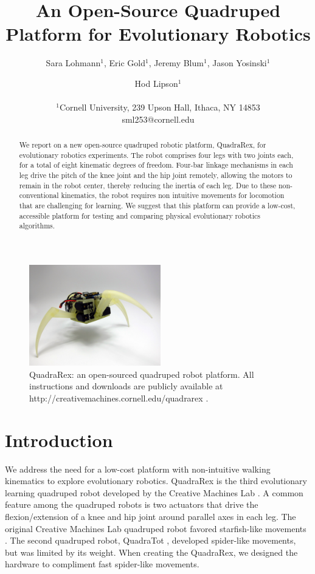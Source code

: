 \documentclass[letterpaper]{article}
\title{An Open-Source Quadruped Platform for Evolutionary Robotics}
\author{Sara Lohmann$^{1}$, Eric Gold$^{1}$, Jeremy Blum$^{1}$, Jason Yosinski$^{1}$ \and Hod Lipson$^{1}$ \\
\mbox{}\\
$^1$Cornell University, 239 Upson Hall, Ithaca, NY 14853 \\
sml253@cornell.edu}
\begin{document}
\maketitle
\begin{figure}[t]
\begin{center}
\includegraphics[width=2.25in,angle=0]{fig1.jpg}
\caption{QuadraRex: an open-sourced quadruped robot platform. All instructions and downloads are publicly available at http://creativemachines.cornell.edu/quadrarex \citep{WEB}.}
\label{fig1}
\end{center}
\end{figure}

\begin{abstract}
We report on a new open-source quadruped robotic platform, QuadraRex, for evolutionary robotics experiments. The robot comprises four legs with two joints each, for a total of eight kinematic degrees of freedom. Four-bar linkage mechanisms in each leg drive the
pitch of the knee joint and the hip joint remotely, allowing the motors to remain in the robot center, thereby reducing the inertia of each leg. Due to these non-conventional kinematics, the robot requires non intuitive movements for locomotion that are challenging for learning. We suggest that this platform can provide a low-cost, accessible platform for testing and comparing physical evolutionary robotics algorithms.
\end{abstract}

\section{Introduction}
We address the need for a low-cost platform with non-intuitive walking kinematics to explore evolutionary robotics. QuadraRex is the third evolutionary learning quadruped robot developed by the Creative Machines Lab \citep{HL, JY}. A common feature among the quadruped robots is two actuators that drive the flexion/extension of a knee and hip joint around parallel axes in each leg. The original Creative Machines Lab quadruped robot favored starfish-like movements \citep{HL}. The second quadruped robot, QuadraTot \citep{JY}, developed spider-like movements, but was limited by its weight. When creating the QuadraRex, we designed the hardware to compliment fast spider-like movements.
\end{document}

